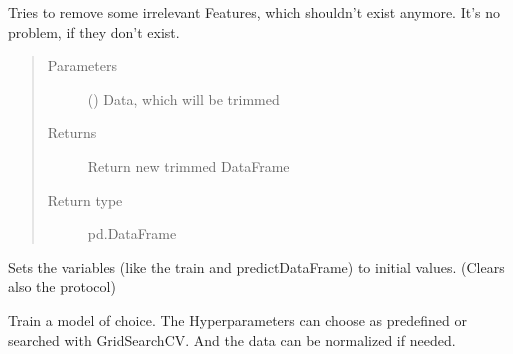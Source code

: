 \documentclass[letterpaper,10pt,english]{sphinxmanual}
\begin{document}
\begin{fulllineitems}
\begin{fulllineitems}
\end{fulllineitems}


\begin{fulllineitems}
\label{\detokenize{anoog.automation:anoog.automation.ai_model.AI_Model.remove_unused_columns}}
\sphinxAtStartPar
Tries to remove some irrelevant Features, which shouldn’t exist anymore.
It’s no problem, if they don’t exist.
\begin{quote}\begin{description}
\item[{Parameters}] \leavevmode
\sphinxAtStartPar
{} () \textendash{} Data, which will be trimmed

\item[{Returns}] \leavevmode
\sphinxAtStartPar
Return new trimmed DataFrame

\item[{Return type}] \leavevmode
\sphinxAtStartPar
pd.DataFrame

\end{description}\end{quote}

\end{fulllineitems}


\begin{fulllineitems}
\label{\detokenize{anoog.automation:anoog.automation.ai_model.AI_Model.reset}}
\sphinxAtStartPar
Sets the variables (like the train and predict\sphinxhyphen{}DataFrame) to initial values.
(Clears also the protocol)

\end{fulllineitems}


\begin{fulllineitems}
\label{\detokenize{anoog.automation:anoog.automation.ai_model.AI_Model.train}}
\sphinxAtStartPar
Train a model of choice. The Hyperparameters can choose as predefined or searched with GridSearchCV.
And the data can be normalized if needed.


\end{fulllineitems}
\end{fulllineitems}
\end{document}
